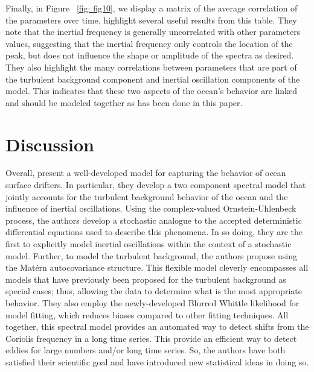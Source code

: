\documentclass{stat572Style}
\begin{document}
\par Finally, in Figure ~\ref{fig: fig10}, we display a matrix of the average correlation of the parameters over time. \citet{Sykulski2016} highlight several useful results from this table. 
They note that the inertial frequency is generally uncorrelated with other parameters values, suggesting that the inertial frequency only controls the location of the peak, but does not influence the shape or amplitude of the spectra as desired. 
They also highlight the many correlations between parameters that are part of the turbulent background component and inertial oscillation components of the model. 
This indicates that these two aspects of the ocean's behavior are linked and should be modeled together as has been done in this paper. 




\section{Discussion}
\par Overall, \citet{Sykulski2016} present a  well-developed model for capturing the behavior of ocean surface drifters.
 In particular, they develop a two component spectral model that jointly accounts for the turbulent background behavior of the ocean and the influence of inertial oscillations. 
 Using the complex-valued Ornstein-Uhlenbeck process, the authors develop a stochastic analogue to the accepted deterministic differential equations used to describe this phenomena. 
 In so doing, they are the first to explicitly model inertial oscillations within the context of a stochastic model. 
 Further, to model the turbulent background, the authors propose using the  Mat\'{e}rn autocovariance structure.
  This flexible model cleverly encompasses all models that have previously been proposed for the turbulent background as special cases; thus, allowing the data to determine what is the most appropriate behavior. 
   They also employ the newly-developed Blurred Whittle likelihood for model fitting, which reduces biases compared to other fitting techniques. 
   All together, this spectral model provides an automated way to detect shifts from the Coriolis frequency in a long time series. 
This provide an efficient way to detect eddies for large numbers and/or long time series. 
So, the authors have both satisfied their scientific goal and have introduced new statistical ideas in doing so.
\end{document}
